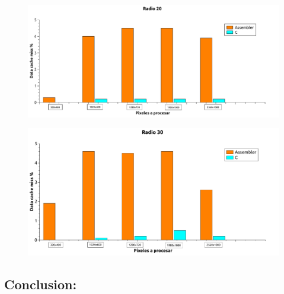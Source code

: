 \begin{figure}[H]
\begin{center}
  \includegraphics[width=\linewidth]{cache/Radio20.pdf} 
\end{center}
\end{figure}

\begin{figure}[H]
\begin{center}
  \includegraphics[width=\linewidth]{cache/Radio30.pdf}
\end{center}
\end{figure}

\subsection{Conclusion:} 

